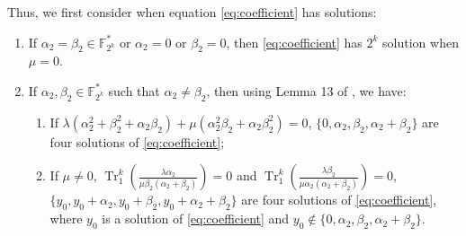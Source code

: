 \documentclass{article}
\newcommand{\F}{\mathbb{F}}
\newcommand{\TRACE}{\operatorname{Tr}_1^k}
\theoremstyle{nonumberplain}
\newcommand{\0}{\textbf{0}}
\newcommand{\1}{\textbf{1}}
\begin{document}
    Thus, we first consider when equation \eqref{eq:coefficient} has solutions: 
    \begin{enumerate}[label=\arabic{*})]
        \item If $ \alpha_2=\beta_2\in\F_{2^k}^* $ or $ \alpha_2=0 $ or $ \beta_2=0 $, 
        then \eqref{eq:coefficient} has $ 2^k $ solution when $ \mu = 0 $.
        \item If $ \alpha_2,\beta_2\in\F_{2^k}^* $ such that $ \alpha_2\ne\beta_2 $, then using Lemma 13 
        of \cite{Further Cryptographic Properties of the Multiplicative Inverse Function}, we have: 
        \begin{enumerate}
            \item If $ \lambda(\alpha_2^2+\beta_2^2+\alpha_2\beta_2)+\mu(\alpha_2^2\beta_2+\alpha_2\beta_2^2)=0 $, 
            $ \{0,\alpha_2,\beta_2,\alpha_2+\beta_2\} $ are four solutions of \eqref{eq:coefficient};
            \item If $ \mu\ne 0 $, $ \TRACE\left(\frac{\lambda\alpha_2}{\mu\beta_2(\alpha_2+\beta_2)}\right)=0 $ and 
            $ \TRACE\left(\frac{\lambda\beta_2}{\mu\alpha_2(\alpha_2+\beta_2)}\right)=0 $, 
            $ \{y_0,y_0+\alpha_2,y_0+\beta_2,y_0+\alpha_2+\beta_2\} $ are four solutions of \eqref{eq:coefficient}, where $ y_0 $ is a solution of \eqref{eq:coefficient} 
            and $ y_0\notin\{0,\alpha_2,\beta_2,\alpha_2+\beta_2\} $. 
        \end{enumerate}
    \end{enumerate} 
\end{document}
